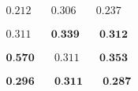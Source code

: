 \newsavebox\tonnetzCNMF
\begin{lrbox}{\tonnetzCNMF}
   $\begin{aligned}
     0.212 & \quad 0.306 & \quad 0.237
    \end{aligned} $
\end{lrbox}

\newsavebox\cqtSF
\begin{lrbox}{\cqtSF}
   $\begin{aligned}
     0.311 & \quad \textbf{0.339} & \quad \textbf{0.312}
    \end{aligned} $
\end{lrbox}

\newsavebox\cqtFoote
\begin{lrbox}{\cqtFoote}
   $\begin{aligned}
     \textbf{0.570} & \quad 0.311 & \quad \textbf{0.353}
    \end{aligned} $
\end{lrbox}

\newsavebox\cqtCNMF
\begin{lrbox}{\cqtCNMF}
   $\begin{aligned}
     \textbf{0.296} & \quad \textbf{0.311} & \quad \textbf{0.287}
    \end{aligned} $
\end{lrbox}


